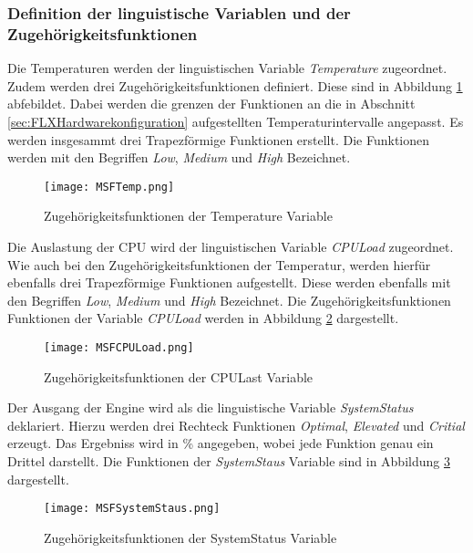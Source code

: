 \subsubsection*{Definition der linguistische Variablen und der Zugehörigkeitsfunktionen}
Die Temperaturen werden der linguistischen Variable \textit{Temperature} zugeordnet. Zudem werden drei Zugehörigkeitsfunktionen definiert. Diese sind in Abbildung \ref{fig:MSFTemp} abfebildet. Dabei werden die grenzen der Funktionen an die in Abschnitt \ref{sec:FLXHardwarekonfiguration} aufgestellten Temperaturintervalle angepasst. Es werden insgesammt drei Trapezförmige Funktionen erstellt. Die Funktionen werden mit den Begriffen \textit{Low}, \textit{Medium} und \textit{High} Bezeichnet.
\begin{center}
    \begin{figure}[h!]
        \centering
        \texttt{[image: MSFTemp.png]}
        \caption{Zugehörigkeitsfunktionen der Temperature Variable}
        \label{fig:MSFTemp}
    \end{figure}
\end{center}
\vspace{-0.5cm}
Die Auslastung der CPU wird der linguistischen Variable \textit{CPULoad} zugeordnet. Wie auch bei den Zugehörigkeitsfunktionen der Temperatur, werden hierfür ebenfalls drei Trapezförmige Funktionen aufgestellt. Diese werden ebenfalls mit den Begriffen \textit{Low}, \textit{Medium} und \textit{High} Bezeichnet. Die Zugehörigkeitsfunktionen Funktionen der Variable \textit{CPULoad} werden in Abbildung \ref{fig:MSFCPULoad} dargestellt.
\begin{center}
    \begin{figure}[h!]
        \centering
        \texttt{[image: MSFCPULoad.png]}
        \caption{Zugehörigkeitsfunktionen der CPULast Variable}
        \label{fig:MSFCPULoad}
    \end{figure}
\end{center}
\vspace{-0.5cm}
Der Ausgang der Engine wird als die linguistische Variable \textit{SystemStatus} deklariert. Hierzu werden drei Rechteck Funktionen \textit{Optimal}, \textit{Elevated} und \textit{Critial} erzeugt. Das Ergebniss wird in \% angegeben, wobei jede Funktion genau ein Drittel darstellt. Die Funktionen der \textit{SystemStaus} Variable sind in Abbildung \ref{fig:MSFSystemStaus} dargestellt.
\begin{center}
    \begin{figure}[h!]
        \centering
        \texttt{[image: MSFSystemStaus.png]}
        \caption{Zugehörigkeitsfunktionen der SystemStatus Variable}
        \label{fig:MSFSystemStaus}
    \end{figure}
\end{center}
\vspace{-0.5cm}  

